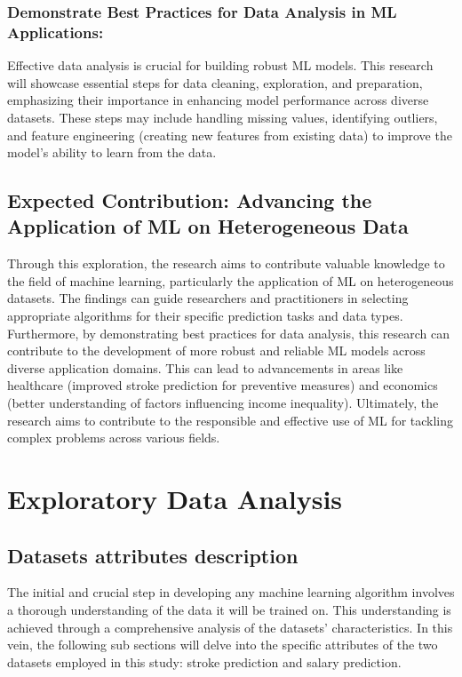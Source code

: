 \documentclass[runningheads]{paper}
\begin{document}
\subsubsection{Demonstrate Best Practices for Data Analysis in ML Applications:}
Effective data analysis is crucial for building robust ML models. This research 
will showcase essential steps for data cleaning, exploration, and preparation, 
emphasizing their importance in enhancing model performance across diverse 
datasets. These steps may include handling missing values, identifying outliers, 
and feature engineering (creating new features from existing data) to improve 
the model's ability to learn from the data.

\subsection{Expected Contribution: Advancing the Application of ML on Heterogeneous Data}
Through this exploration, the research aims to contribute valuable knowledge to 
the field of machine learning, particularly the application of ML on 
heterogeneous datasets.  The findings can guide researchers and practitioners 
in selecting appropriate algorithms for their specific prediction tasks and 
data types.  Furthermore, by demonstrating best practices for data analysis, 
this research can contribute to the development of more robust and reliable ML 
models across diverse application domains. This can lead to advancements in 
areas like healthcare (improved stroke prediction for preventive measures) and 
economics (better understanding of factors influencing income inequality).  
Ultimately, the research aims to contribute to the responsible and effective use 
of ML for tackling complex problems across various fields.
\section{Exploratory Data Analysis}

\subsection{Datasets attributes description}
The initial and crucial step in developing any machine learning algorithm 
involves a thorough understanding of the data it will be trained on. This 
understanding is achieved through a comprehensive analysis of the datasets' 
characteristics. In this vein, the following sub sections will delve into the 
specific attributes of the two datasets employed in this study: stroke 
prediction and salary prediction.
\end{document}
